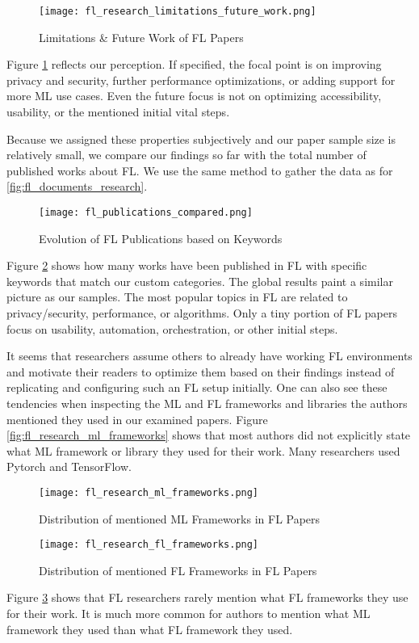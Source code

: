 \begin{figure}[h]
    \centering
    \texttt{[image: fl\_research\_limitations\_future\_work.png]}
    \caption{Limitations \& Future Work of FL Papers}
    \label{fig:fl_research_limitations_future_work}
\end{figure}

Figure \ref{fig:fl_research_limitations_future_work} reflects our perception.
If specified, the focal point is on improving privacy and security, further performance optimizations, or adding support for more ML use cases.
Even the future focus is not on optimizing accessibility, usability, or the mentioned initial vital steps.

Because we assigned these properties subjectively and our paper sample size is relatively small,
we compare our findings so far with the total number of published works about FL.
We use the same method to gather the data as for \ref{fig:fl_documents_research}.
\begin{figure}[h]
    \centering
    \texttt{[image: fl\_publications\_compared.png]}
    \caption{Evolution of FL Publications based on Keywords}
    \label{fig:fl_publications_compared}
\end{figure}
Figure \ref{fig:fl_publications_compared} shows how many works have been published in FL with
specific keywords that match our custom categories.
The global results paint a similar picture as our samples.
The most popular topics in FL are related to privacy/security, performance,
or algorithms.
Only a tiny portion of FL papers focus on usability, automation, orchestration,
or other initial steps.

It seems that researchers assume others to already have working FL environments
and motivate their readers to optimize them based on their findings
instead of replicating and configuring such an FL setup initially.
One can also see these tendencies when inspecting the ML and FL frameworks and libraries
the authors mentioned they used in our examined papers.
Figure \ref{fig:fl_research_ml_frameworks} shows that most authors
did not explicitly state what ML framework or library they used for their work.
Many researchers used Pytorch and TensorFlow.
\begin{figure}[p]
    \centering
    \texttt{[image: fl\_research\_ml\_frameworks.png]}
    \caption{Distribution of mentioned ML Frameworks in FL Papers}
    \label{fig:fl_research_ml_frameworks}

    \texttt{[image: fl\_research\_fl\_frameworks.png]}
    \caption{Distribution of mentioned FL Frameworks in FL Papers}
    \label{fig:fl_research_fl_frameworks}
\end{figure}
Figure \ref{fig:fl_research_fl_frameworks} shows that FL researchers
rarely mention what FL frameworks they use for their work.
It is much more common for authors to mention what ML 
framework they used than what FL framework they used.

